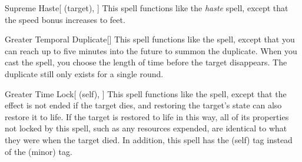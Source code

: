 \lowercase{\hypertarget{spell:Supreme Haste}{}}\label{spell:Supreme Haste}
\begin{attuneability}[\nth{5}]{\hypertarget{spell:Supreme Haste}{Supreme Haste}}[ (target), ]
This spell functions like the \textit{haste} spell, except that the speed bonus increases to  feet.
\end{attuneability}
\vspace{0.25em}



\lowercase{\hypertarget{spell:Greater Temporal Duplicate}{}}\label{spell:Greater Temporal Duplicate}
\begin{freeability}[\nth{7}]{\hypertarget{spell:Greater Temporal Duplicate}{Greater Temporal Duplicate}}[]
This spell functions like the  spell, except that you can reach up to five minutes into the future to summon the duplicate.
When you cast the spell, you choose the length of time before the target disappears.
The duplicate still only exists for a single round.
\end{freeability}
\vspace{0.25em}



\lowercase{\hypertarget{spell:Greater Time Lock}{}}\label{spell:Greater Time Lock}
\begin{attuneability}[\nth{7}]{\hypertarget{spell:Greater Time Lock}{Greater Time Lock}}[ (self), ]
This spell functions like the  spell, except that the effect is not ended if the target dies, and restoring the target's state can also restore it to life.
If the target is restored to life in this way, all of its properties not locked by this spell, such as any resources expended, are identical to what they were when the target died.
In addition, this spell has the  (self) tag instead of the  (minor) tag.
\end{attuneability}
\vspace{0.25em}



